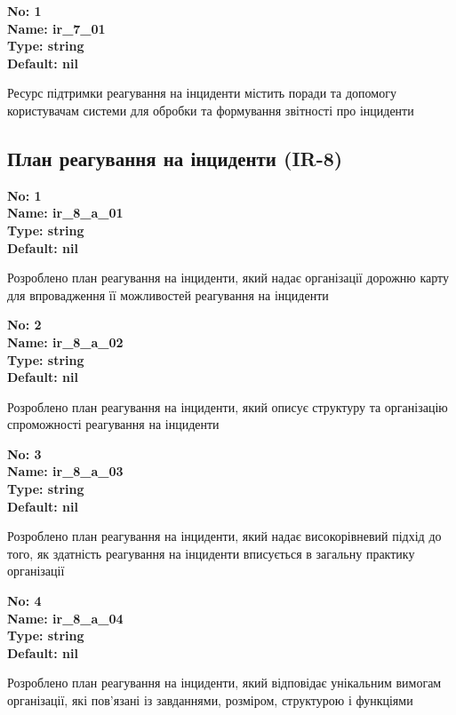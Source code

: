 \documentclass{article}
\begin{document}
\vspace{10pt}
{\footnotesize\bfseries
No: 1\\
Name: ir\_\allowbreak{}7\_\allowbreak{}01\\
Type: string\\
Default: nil
}

{\footnotesize Ресурс підтримки реагування на інциденти містить поради та допомогу користувачам системи для обробки та формування звітності про інциденти}




\subsection{План реагування на інциденти (IR-8)}


\vspace{10pt}
{\footnotesize\bfseries
No: 1\\
Name: ir\_\allowbreak{}8\_\allowbreak{}a\_\allowbreak{}01\\
Type: string\\
Default: nil
}

{\footnotesize Розроблено план реагування на інциденти, який надає організації дорожню карту для впровадження її можливостей реагування на інциденти}


{\footnotesize\bfseries
No: 2\\
Name: ir\_\allowbreak{}8\_\allowbreak{}a\_\allowbreak{}02\\
Type: string\\
Default: nil
}

{\footnotesize Розроблено план реагування на інциденти, який описує структуру та організацію спроможності реагування на інциденти}


{\footnotesize\bfseries
No: 3\\
Name: ir\_\allowbreak{}8\_\allowbreak{}a\_\allowbreak{}03\\
Type: string\\
Default: nil
}

{\footnotesize Розроблено план реагування на інциденти, який надає високорівневий підхід до того, як здатність реагування на інциденти вписується в загальну практику організації}


{\footnotesize\bfseries
No: 4\\
Name: ir\_\allowbreak{}8\_\allowbreak{}a\_\allowbreak{}04\\
Type: string\\
Default: nil
}

{\footnotesize Розроблено план реагування на інциденти, який відповідає унікальним вимогам організації, які пов'язані із завданнями, розміром, структурою і функціями}
\end{document}
